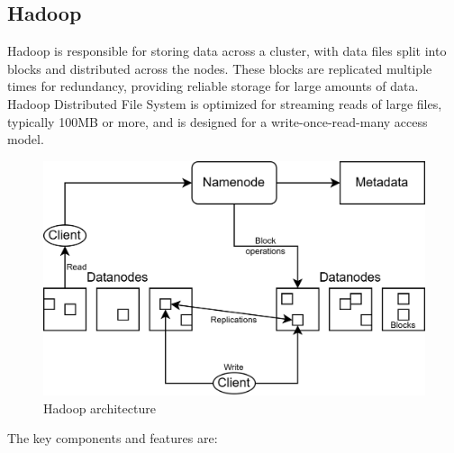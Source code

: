 \subsection{Hadoop}
Hadoop is responsible for storing data across a cluster, with data files split into blocks and distributed across the nodes.
These blocks are replicated multiple times for redundancy, providing reliable storage for large amounts of data. 
Hadoop Distributed File System is optimized for streaming reads of large files, typically 100MB or more, and is designed for a write-once-read-many access model.
\begin{figure}[H]
    \centering
    \includegraphics[width=0.75\linewidth]{images/hadoop.png}
    \caption{Hadoop architecture}
\end{figure}
The key components and features are: 
